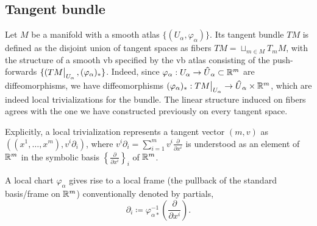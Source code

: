 \subsection{Tangent bundle}

\begin{defn}
    Let $M$ be a manifold with a smooth atlas $\{(U_\alpha,\varphi_\alpha)\}$. Its tangent bundle $TM$ is defined as the disjoint union of tangent spaces as fibers $TM=\sqcup_{m\in M} T_m M$, with the structure of a smooth \gls{vb} specified by the \gls{vb} atlas consisting of the push-forwards $\{(\restr{TM}{U_\alpha},(\varphi_\alpha)_\ast\}$. Indeed, since $\varphi_\alpha:U_\alpha\to \wh U_\alpha \subset \bbR^m$ are diffeomorphisms, we have diffeomorphisms $(\varphi_\alpha)_\ast:\restr{TM}{U_\alpha}\to \wh U_\alpha\times \bbR^m$, which are indeed local trivializations for the bundle. The linear structure induced on fibers agrees with the one we have constructed previously on every tangent space.
\end{defn}

Explicitly, a local trivialization represents a tangent vector $(m,v)$ as $((x^1,\ldots,x^m),v^i\partial_i)$, where $v^i\partial_i=\sum_{i=1}^m v^i\frac{\partial}{\partial x^i}$ is understood as an element of $\mathbb{R}^m$ in the symbolic basis $\left\{\frac{\partial}{\partial x^i}\right\}_i$ of $\mathbb{R}^m$.

A local chart $\varphi_\alpha$ gives rise to a local frame (the pullback of the standard basis/frame on $\mathbb{R}^m$) conventionally denoted by partials, \[\partial_i\coloneqq \varphi_{\alpha\ast}^{-1}\left(\frac{\partial}{\partial x^i}\right).\]


